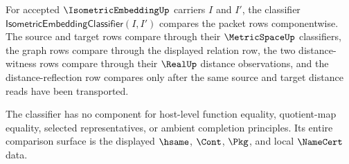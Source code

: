 \begin{definition}
\label{def:isometric-embedding-classifier}
For accepted $\IsometricEmbeddingUp$ carriers $I$ and $I'$, the classifier $\mathsf{IsometricEmbeddingClassifier}(I,I')$ compares the packet rows componentwise. The source and target rows compare through their $\MetricSpaceUp$ classifiers, the graph rows compare through the displayed relation row, the two distance-witness rows compare through their $\RealUp$ distance observations, and the distance-reflection row compares only after the same source and target distance reads have been transported.

The classifier has no component for host-level function equality, quotient-map equality, selected representatives, or ambient completion principles. Its entire comparison surface is the displayed $\hsame$, $\Cont$, $\Pkg$, and local $\NameCert$ data.
\end{definition}

